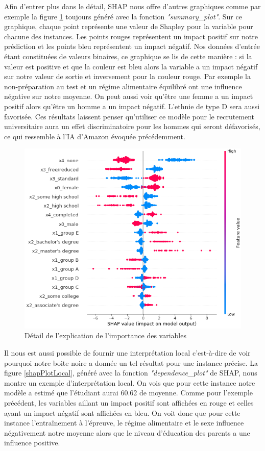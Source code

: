 Afin d'entrer plus dans le détail, SHAP nous offre d'autres graphiques comme par exemple la figure \ref{shapPlotDetail} toujours généré avec la fonction \textit{"summary\_plot"}. Sur ce graphique, chaque point représente une valeur de Shapley pour la variable pour chacune des instances. Les points rouges représentent un impact positif sur notre prédiction et les points bleu représentent un impact négatif. Nos données d'entrée étant constituées de valeurs binaires, ce graphique se lis de cette manière : si la valeur est positive et que la couleur est bleu alors la variable a un impact négatif sur notre valeur de sortie et inversement pour la couleur rouge. Par exemple la non-préparation au test et un régime alimentaire équilibré ont une influence négative sur notre moyenne. On peut aussi voir qu'être une femme a un impact positif alors qu'être un homme a un impact négatif. L’ethnie de type D sera aussi favorisée. Ces résultats laissent penser qu'utiliser ce modèle pour le recrutement universitaire aura un effet discriminatoire pour les hommes qui seront défavorisés, ce qui ressemble à l’IA d’Amazon évoquée précédemment.
\begin{figure}[h]
    \includegraphics[scale=0.6]{src_img/shapPlotDetail.png}
    \caption{Détail de l'explication de l'importance des variables}
    \label{shapPlotDetail}
\end{figure}
Il nous est aussi possible de fournir une interprétation local c'est-à-dire de voir pourquoi notre boite noire a donnée un tel résultat pour une instance précise. La figure \ref{shapPlotLocal}, généré avec la fonction \textit{"dependence\_plot"} de SHAP, nous montre un exemple d'interprétation local. On vois que pour cette instance notre modèle a estimé que l'étudiant aurai 60.62 de moyenne. Comme pour l'exemple précédent, les variables aillant un impact positif sont affichées en rouge et celles ayant un impact négatif sont affichées en bleu. On voit donc que pour cette instance l'entraînement à l'épreuve, le régime alimentaire et le sexe influence négativement notre moyenne alors que le niveau d’éducation des parents a une influence positive.
